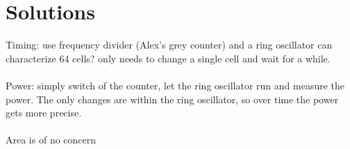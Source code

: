\section*{Solutions}

Timing: use frequency divider (Alex's grey counter) and a ring oscillator
can characterize 64 cells? only needs to change a single cell and wait for a while.\\
\\
Power: simply switch of the counter, let the ring oscillator run and measure the power. The only changes are within the ring oscillator, so over time the power gets more precise.\\
\\
Area is of no concern